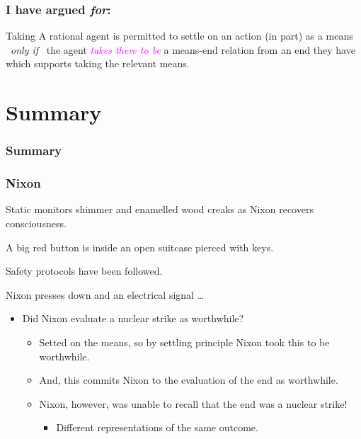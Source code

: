 \documentclass[noamssymb,
]{beamer} %
\newcommand{\hozlinedash}[0]{
  \noindent\hdashrule[0.5ex][c]{\textwidth}{.1pt}{2.5pt}
}
\begin{document}
\begin{frame}
  \frametitle{I have argued \emph{for}:}
    \begin{block}{Taking}
    A rational agent is permitted to settle on an action (in part) as a means
    \newline
    \mbox{ }\hfill\emph{only if}\hfill\mbox{ }
    \newline
    the agent \textcolor{fuchsia}{\emph{takes there to be}} a means-end relation from an end they have which supports taking the relevant means.
  \end{block}
\end{frame}

\section{Summary}
\label{sec:summary}


\begin{frame}
  \frametitle{Summary}


\end{frame}


\begin{frame}
  \frametitle{Nixon}

  {\rmfamily
    Static monitors shimmer and enamelled wood creaks as Nixon recovers consciousness.

    A big red button is inside an open suitcase pierced with keys.

    Safety protocols have been followed.

    Nixon presses down and an electrical signal \dots
  }

  \pause
  \hozlinedash

  \begin{itemize}
  \item<+-> Did Nixon evaluate a nuclear strike as worthwhile?
    \begin{itemize}
    \item<+-> Setted on the means, so by settling principle Nixon took this to be worthwhile.
    \item<+-> And, this commits Nixon to the evaluation of the end as worthwhile.
    \item<+-> Nixon, however, was unable to recall that the end was a nuclear strike!
      \begin{itemize}
      \item<+-> Different representations of the same outcome.
      \end{itemize}
    \end{itemize}
  \end{itemize}
\end{frame}
\end{document}
